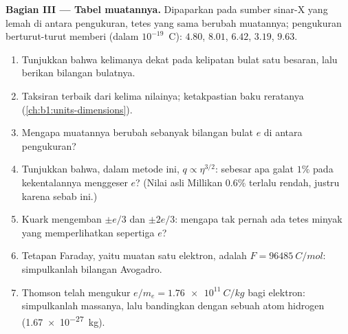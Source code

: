 \begin{problem}
\medskip
\noindent\textbf{Bagian III --- Tabel muatannya.}
Dipaparkan pada sumber sinar-X yang lemah di antara pengukuran, tetes yang sama
berubah muatannya; pengukuran berturut-turut memberi (dalam $10^{-19}$~C):
$4.80$, $8.01$, $6.42$, $3.19$, $9.63$.
\begin{enumerate}[resume]
  \item Tunjukkan bahwa kelimanya dekat pada kelipatan bulat satu
        besaran, lalu berikan bilangan bulatnya.
  \item Taksiran terbaik  dari kelima nilainya; ketakpastian
        baku reratanya (\cref{ch:b1:units-dimensions}).
  \item Mengapa muatannya berubah sebanyak bilangan bulat $e$ di antara
        pengukuran?
  \item Tunjukkan bahwa, dalam metode ini, $q \propto \eta^{3/2}$: sebesar apa
        galat $1\%$ pada kekentalannya menggeser $e$? (Nilai asli Millikan
        $0.6\%$ terlalu rendah, justru karena sebab ini.)
  \item Kuark mengemban $\pm e/3$ dan $\pm 2e/3$: mengapa tak pernah ada tetes
        minyak yang memperlihatkan sepertiga $e$?
  \item Tetapan Faraday, yaitu muatan satu  elektron, adalah
        $F = \qty{96485}{C/mol}$: simpulkanlah bilangan Avogadro.
  \item Thomson telah mengukur $e/m_e = \qty{1.76e11}{C/kg}$ bagi
        elektron: simpulkanlah massanya, lalu bandingkan dengan sebuah atom
        hidrogen (\qty{1.67e-27}{kg}).
\end{enumerate}


\end{problem}
